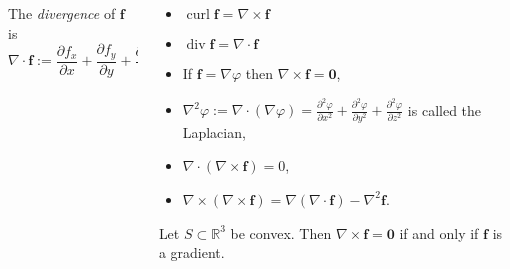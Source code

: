 \documentclass[aspectratio=169]{beamer}
\newcommand{\bR}{\mathbb{R}} %
\newcommand{\ff}{\mathbf{f}}
\begin{document}
\begin{frame}
\begin{columns}
\begin{column}{.5\textwidth}
            \begin{definition}[divergence]
                The \emph{divergence} of \(\ff\) is
                \[
                    \nabla \cdot \ff := \frac{\partial f_x}{\partial x} +  \frac{\partial f_y}{\partial y} +  \frac{\partial f_z}{\partial z}.
                \]
            \end{definition}
        \end{column}
        \begin{column}{.5\textwidth}
            \begin{itemize}
                \item \(\operatorname{curl} \ff = \nabla \times \ff\)
                \item \(\operatorname{div} \ff = \nabla \cdot \ff\)
            \end{itemize}
            \begin{itemize}
                \item If \(\ff = \nabla \varphi\) then \( \nabla \times \ff = \mathbf{0} \),
                \item \(\nabla^2 \varphi := \nabla \cdot (\nabla \varphi) =
                      \frac{\partial^2 \varphi}{\partial x^2} +
                      \frac{\partial^2 \varphi}{\partial y^2} +
                      \frac{\partial^2 \varphi}{\partial z^2}\)
                      is called the Laplacian,
                \item \(\nabla \cdot (\nabla \times \ff) = 0\),
                \item \(\nabla \times (\nabla \times \ff) = \nabla(\nabla\cdot \ff) - \nabla^2 \ff\).
            \end{itemize}

            \begin{theorem}
                Let \(S\subset \bR^3\) be convex. Then \(\nabla \times \ff = \mathbf{0}\) if and only if \(\ff\) is a gradient.
            \end{theorem}
        \end{column}
    \end{columns}

\end{frame}
\end{document}
